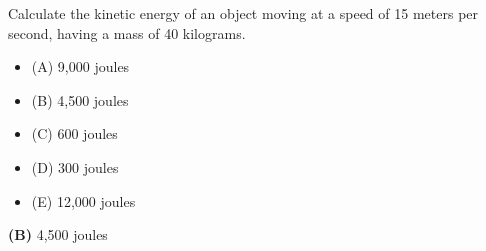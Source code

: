

Calculate the kinetic energy of an object moving at a speed of 15 meters per second, having a mass of 40 kilograms.

\begin{itemize}
\item{(A)} 9,000 joules
\vskip 5pt 
\item{(B)} 4,500 joules
\vskip 5pt 
\item{(C)} 600 joules
\vskip 5pt 
\item{(D)} 300 joules
\vskip 5pt 
\item{(E)} 12,000 joules
\end{itemize}







{\bf (B)} 4,500 joules
 










